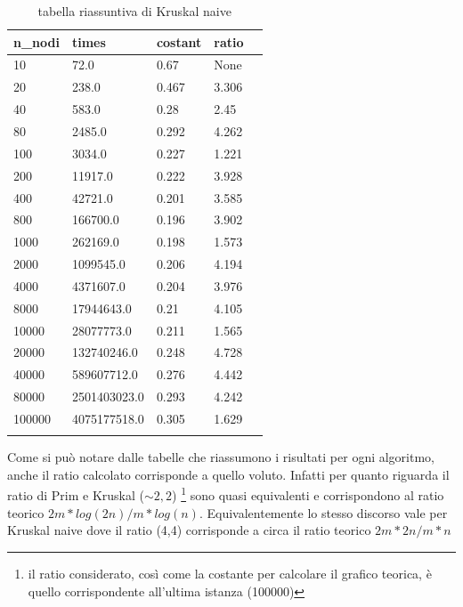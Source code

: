 \newpage
{}
\renewcommand{\arraystretch}{2}
\begin{longtable}[H]{|p{2cm}|p{2cm}|p{3cm}|p{3cm}|p{3cm}|} \hline
    \rowcolor{lightgray}
    \textbf{n\_nodi} & \textbf{times} & \textbf{costant} & \textbf{ratio} \\ \hline\hline
    \endhead
    10	&	72.0		&	0.67	&	None \\ \hline
    20	&	238.0		&	0.467	&	3.306 \\ \hline
    40	&	583.0		&	0.28 &		2.45 \\ \hline
    80	&	2485.0		&	0.292 &		4.262 \\ \hline
    100	&	3034.0		&	0.227   &	1.221 \\ \hline
    200	&	11917.0		&	0.222	&	3.928 \\ \hline
    400	&	42721.0		&	0.201	&	3.585 \\ \hline
    800	&	166700.0	&	0.196	&   3.902 \\ \hline
    1000 &	262169.0	&	0.198	&   1.573 \\ \hline
    2000 &	1099545.0	&	0.206	&   4.194 \\ \hline
    4000 &	4371607.0	&	0.204 &		3.976 \\ \hline
    8000 &	17944643.0	&	0.21 &		4.105 \\ \hline
    10000 &	28077773.0	&	0.211 &		1.565 \\ \hline
    20000 &	132740246.0	&	0.248 &		4.728 \\ \hline
    40000 &	589607712.0	&	0.276 &		4.442 \\ \hline
    80000 &	2501403023.0 &	0.293 &		4.242 \\ \hline
    100000 &	4075177518.0 &	0.305 &		1.629 \\ \hline
    \caption{tabella riassuntiva di Kruskal naive}
\end{longtable}

Come si può notare dalle tabelle che riassumono i risultati per ogni algoritmo, anche il ratio calcolato corrisponde a quello voluto. Infatti per quanto riguarda il ratio di Prim e Kruskal ($\sim 2,2$) \footnote{il ratio considerato, così come la costante per calcolare il grafico teorica, è quello corrispondente all'ultima istanza (100000)} sono quasi equivalenti e corrispondono al ratio teorico $2m*log(2n) / m*log(n)$.
Equivalentemente lo stesso discorso vale per Kruskal naive dove il ratio (4,4) corrisponde a circa il ratio teorico $2m*2n/m*n$



